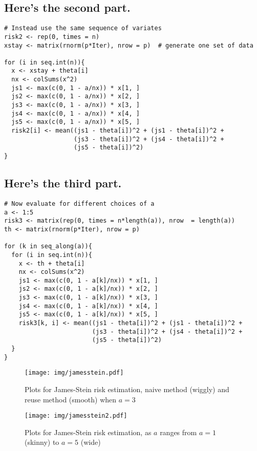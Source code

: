 \documentclass[11pt,english]{article}
\begin{document}
\subsection*{Here's the second part.}
\label{sec-1_2}


\begin{verbatim}
# Instead use the same sequence of variates
risk2 <- rep(0, times = n)
xstay <- matrix(rnorm(p*Iter), nrow = p)  # generate one set of data

for (i in seq.int(n)){
  x <- xstay + theta[i]
  nx <- colSums(x^2)
  js1 <- max(c(0, 1 - a/nx)) * x[1, ]
  js2 <- max(c(0, 1 - a/nx)) * x[2, ]
  js3 <- max(c(0, 1 - a/nx)) * x[3, ]
  js4 <- max(c(0, 1 - a/nx)) * x[4, ]
  js5 <- max(c(0, 1 - a/nx)) * x[5, ]
  risk2[i] <- mean((js1 - theta[i])^2 + (js1 - theta[i])^2 + 
                   (js3 - theta[i])^2 + (js4 - theta[i])^2 + 
                   (js5 - theta[i])^2)
}
\end{verbatim}
\subsection*{Here's the third part.}
\label{sec-1_3}


\begin{verbatim}
# Now evaluate for different choices of a
a <- 1:5
risk3 <- matrix(rep(0, times = n*length(a)), nrow  = length(a))
th <- matrix(rnorm(p*Iter), nrow = p)

for (k in seq_along(a)){
  for (i in seq.int(n)){
    x <- th + theta[i]
    nx <- colSums(x^2)
    js1 <- max(c(0, 1 - a[k]/nx)) * x[1, ]
    js2 <- max(c(0, 1 - a[k]/nx)) * x[2, ]
    js3 <- max(c(0, 1 - a[k]/nx)) * x[3, ]
    js4 <- max(c(0, 1 - a[k]/nx)) * x[4, ]
    js5 <- max(c(0, 1 - a[k]/nx)) * x[5, ]
    risk3[k, i] <- mean((js1 - theta[i])^2 + (js1 - theta[i])^2 + 
                        (js3 - theta[i])^2 + (js4 - theta[i])^2 + 
                        (js5 - theta[i])^2)
  }
}
\end{verbatim}


\begin{figure}[h!]
\centering
\texttt{[image: img/jamesstein.pdf]}
\caption{\label{fig:yplot}Plots for James-Stein risk estimation, naive method (wiggly) and reuse method (smooth) when $a = 3$}
\end{figure}



\begin{figure}[h!]
\centering
\texttt{[image: img/jamesstein2.pdf]}
\caption{\label{fig:yplot}Plots for James-Stein risk estimation, as $a$ ranges from $a = 1$ (skinny) to $a = 5$ (wide)}
\end{figure}
\end{document}
